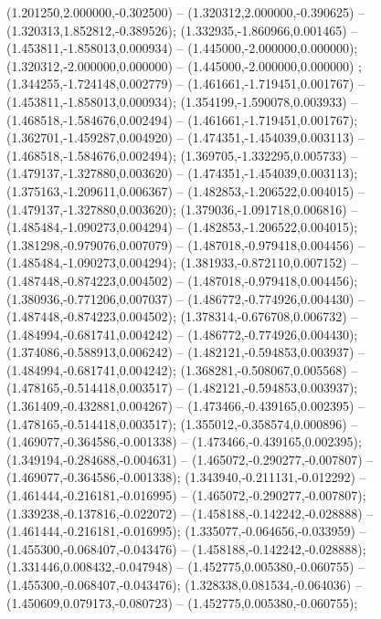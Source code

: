  (1.201250,2.000000,-0.302500) -- (1.320312,2.000000,-0.390625) -- (1.320313,1.852812,-0.389526);
 (1.332935,-1.860966,0.001465) -- (1.453811,-1.858013,0.000934) -- (1.445000,-2.000000,0.000000);
 (1.320312,-2.000000,0.000000) -- (1.445000,-2.000000,0.000000) ;
 (1.344255,-1.724148,0.002779) -- (1.461661,-1.719451,0.001767) -- (1.453811,-1.858013,0.000934);
 (1.354199,-1.590078,0.003933) -- (1.468518,-1.584676,0.002494) -- (1.461661,-1.719451,0.001767);
 (1.362701,-1.459287,0.004920) -- (1.474351,-1.454039,0.003113) -- (1.468518,-1.584676,0.002494);
 (1.369705,-1.332295,0.005733) -- (1.479137,-1.327880,0.003620) -- (1.474351,-1.454039,0.003113);
 (1.375163,-1.209611,0.006367) -- (1.482853,-1.206522,0.004015) -- (1.479137,-1.327880,0.003620);
 (1.379036,-1.091718,0.006816) -- (1.485484,-1.090273,0.004294) -- (1.482853,-1.206522,0.004015);
 (1.381298,-0.979076,0.007079) -- (1.487018,-0.979418,0.004456) -- (1.485484,-1.090273,0.004294);
 (1.381933,-0.872110,0.007152) -- (1.487448,-0.874223,0.004502) -- (1.487018,-0.979418,0.004456);
 (1.380936,-0.771206,0.007037) -- (1.486772,-0.774926,0.004430) -- (1.487448,-0.874223,0.004502);
 (1.378314,-0.676708,0.006732) -- (1.484994,-0.681741,0.004242) -- (1.486772,-0.774926,0.004430);
 (1.374086,-0.588913,0.006242) -- (1.482121,-0.594853,0.003937) -- (1.484994,-0.681741,0.004242);
 (1.368281,-0.508067,0.005568) -- (1.478165,-0.514418,0.003517) -- (1.482121,-0.594853,0.003937);
 (1.361409,-0.432881,0.004267) -- (1.473466,-0.439165,0.002395) -- (1.478165,-0.514418,0.003517);
 (1.355012,-0.358574,0.000896) -- (1.469077,-0.364586,-0.001338) -- (1.473466,-0.439165,0.002395);
 (1.349194,-0.284688,-0.004631) -- (1.465072,-0.290277,-0.007807) -- (1.469077,-0.364586,-0.001338);
 (1.343940,-0.211131,-0.012292) -- (1.461444,-0.216181,-0.016995) -- (1.465072,-0.290277,-0.007807);
 (1.339238,-0.137816,-0.022072) -- (1.458188,-0.142242,-0.028888) -- (1.461444,-0.216181,-0.016995);
 (1.335077,-0.064656,-0.033959) -- (1.455300,-0.068407,-0.043476) -- (1.458188,-0.142242,-0.028888);
 (1.331446,0.008432,-0.047948) -- (1.452775,0.005380,-0.060755) -- (1.455300,-0.068407,-0.043476);
 (1.328338,0.081534,-0.064036) -- (1.450609,0.079173,-0.080723) -- (1.452775,0.005380,-0.060755);
